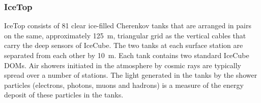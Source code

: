 \subsubsection{IceTop}

IceTop \cite{ICECUBE:IceTop} consists of \num{81} clear ice-filled  Cherenkov tanks that are arranged in pairs on the same, approximately \SI{125}{\meter}, triangular grid as the vertical cables that carry the deep sensors of IceCube. The two tanks at each surface station are separated from each other by \SI{10}{\meter}. Each tank contains two standard IceCube DOMs. Air showers initiated in the atmosphere by cosmic rays are typically spread over a number of stations. The light generated in the tanks by the shower particles (electrons, photons, muons and hadrons) is a measure of the energy deposit of these particles in the tanks.



